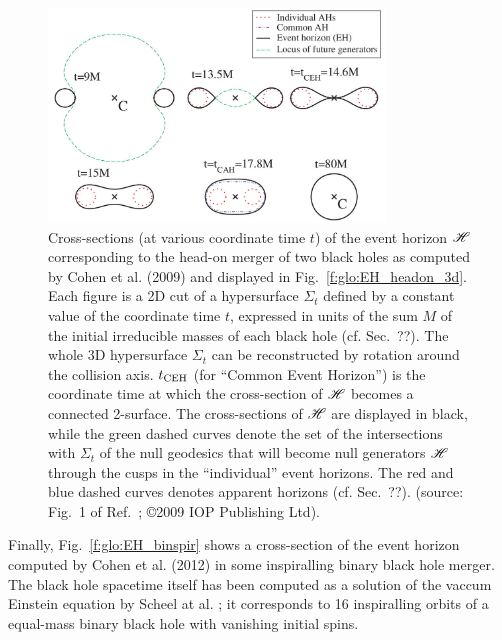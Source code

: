 \begin{figure}
\centerline{\includegraphics[width=0.8\textwidth]{glo_EH_headon.jpg}}
\caption[]{\label{f:glo:EH_headon} \footnotesize
Cross-sections (at various coordinate time $t$) of the event horizon $\mathscr{H}$ corresponding
to the head-on merger of two black holes as computed by Cohen et al. (2009) \cite{CohenPS09}
and displayed in Fig.~\ref{f:glo:EH_headon_3d}.
Each figure is a 2D cut of a hypersurface $\Sigma_t$ defined by a constant
value of the coordinate time $t$, expressed in units of the sum $M$ of the initial irreducible masses of each black
hole (cf. Sec.~??). The whole 3D hypersurface $\Sigma_t$ can be reconstructed
by rotation around the collision axis.
$t_{\rm CEH}$ (for ``Common Event Horizon'')
is the coordinate time at which the cross-section of $\mathscr{H}$ becomes a connected
2-surface.
The cross-sections of $\mathscr{H}$ are displayed
in black, while the green dashed curves denote the set of the intersections
with $\Sigma_t$ of the null geodesics that
will become null generators $\mathscr{H}$ through the cusps in the
``individual'' event horizons.
The red and blue dashed curves denotes apparent horizons (cf. Sec.~??).
(source: Fig.~1 of Ref.~\cite{CohenPS09}; \copyright  2009 IOP Publishing Ltd).}
\end{figure}

Finally, Fig.~\ref{f:glo:EH_binspir} shows a cross-section
of the event horizon computed by Cohen et al. (2012) \cite{CohenKS12}
in some inspiralling binary black hole merger. The
black hole spacetime itself has been computed as a solution of the vaccum
Einstein equation by Scheel at al. \cite{ScheeBCKMP09}; it corresponds to
16 inspiralling orbits of a equal-mass binary black hole with vanishing initial
spins.

